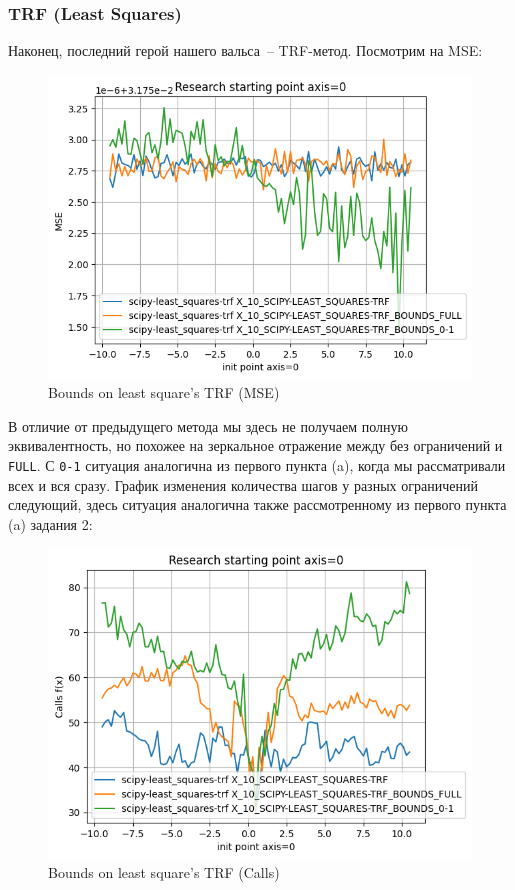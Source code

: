 \documentclass[12pt, a4paper, oneside, final]{article}
\begin{document}
	\subsubsection*{TRF (Least Squares)}
	Наконец, последний герой нашего вальса~-- TRF-метод.
	Посмотрим на MSE:
	\begin{figure}[H]
		\centering
		\includegraphics[scale = 1]{Image/T2C_TRF_MSE.png}
		\caption*{Bounds on least square's TRF (MSE)}
	\end{figure}
	В отличие от предыдущего метода мы здесь не получаем полную эквивалентность, но похожее на зеркальное отражение между без ограничений и \texttt{FULL}.
	С \texttt{0-1} ситуация аналогична из первого пункта (a), когда мы рассматривали всех и вся сразу.
	График изменения количества шагов у разных ограничений следующий, здесь ситуация аналогична также рассмотренному из первого пункта (a) задания 2:
	\begin{figure}[H]
		\centering
		\includegraphics[scale = 1]{Image/T2C_TRF_CALLS.png}
		\caption*{Bounds on least square's TRF (Calls)}
	\end{figure}
	\newpage
\end{document}
